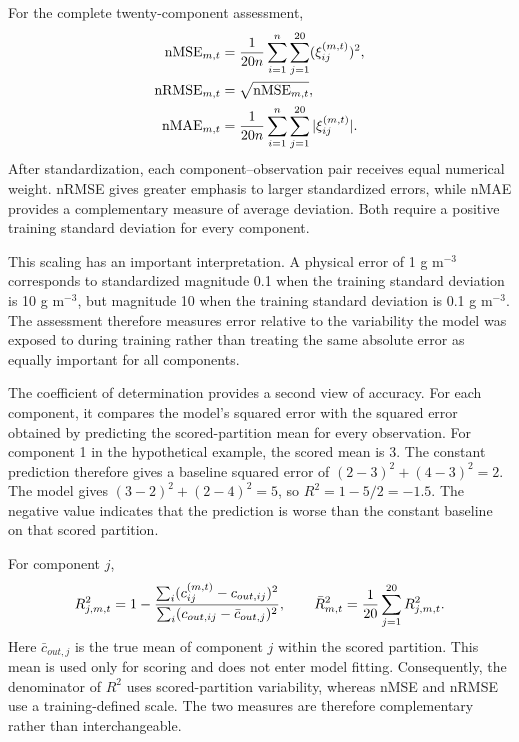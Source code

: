 For the complete twenty-component assessment,
\begin{align}
\equationname{Normalized mean squared component error}
\mathrm{nMSE}_{m,t}&=\frac{1}{20n}\sum_{i=1}^{n}\sum_{j=1}^{20}(\xi_{ij}^{(m,t)})^2,\label{eq:projection_nmse}\\
\equationname{Normalized root mean squared component error}
\mathrm{nRMSE}_{m,t}&=\sqrt{\mathrm{nMSE}_{m,t}},\label{eq:projection_nrmse}\\
\equationname{Normalized mean absolute component error}
\mathrm{nMAE}_{m,t}&=\frac{1}{20n}\sum_{i=1}^{n}\sum_{j=1}^{20}|\xi_{ij}^{(m,t)}|.
\label{eq:projection_nmae}
\end{align}
After standardization, each component--observation pair receives equal numerical weight. nRMSE gives greater emphasis to larger standardized errors, while nMAE provides a complementary measure of average deviation. Both require a positive training standard deviation for every component.

This scaling has an important interpretation. A physical error of 1 g m$^{-3}$ corresponds to standardized magnitude 0.1 when the training standard deviation is 10 g m$^{-3}$, but magnitude 10 when the training standard deviation is 0.1 g m$^{-3}$. The assessment therefore measures error relative to the variability the model was exposed to during training rather than treating the same absolute error as equally important for all components.

The coefficient of determination provides a second view of accuracy. For each component, it compares the model's squared error with the squared error obtained by predicting the scored-partition mean for every observation. For component 1 in the hypothetical example, the scored mean is 3. The constant prediction therefore gives a baseline squared error of
$(2-3)^2+(4-3)^2=2$.
The model gives
$(3-2)^2+(2-4)^2=5$,
so
$R^2=1-5/2=-1.5$.
The negative value indicates that the prediction is worse than the constant baseline on that scored partition.

For component $j$,
\begin{equation}
\equationname{Component and macro-average coefficients of determination}
R_{j,m,t}^2=1-
\frac{\sum_i(c_{ij}^{(m,t)}-c_{out,ij})^2}
{\sum_i(c_{out,ij}-\bar c_{out,j})^2},\qquad
\bar R_{m,t}^2=\frac{1}{20}\sum_{j=1}^{20}R_{j,m,t}^2.
\label{eq:projection_r_squared}
\end{equation}
Here
$\bar c_{out,j}$
is the true mean of component $j$ within the scored partition. This mean is used only for scoring and does not enter model fitting. Consequently, the denominator of $R^2$ uses scored-partition variability, whereas nMSE and nRMSE use a training-defined scale. The two measures are therefore complementary rather than interchangeable.

